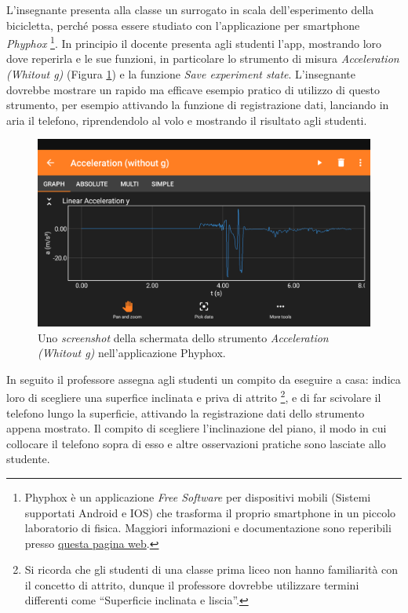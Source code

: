 \documentclass{report} \usepackage[T1]{fontenc} \usepackage[italian]{babel}
\begin{document}
L'insegnante presenta alla classe un surrogato in scala dell'esperimento della
bicicletta, perché possa essere studiato con l'applicazione per smartphone
\emph{Phyphox}
\footnote{
          Phyphox è un applicazione \emph{Free Software} per dispositivi mobili
          (Sistemi supportati Android e IOS) che trasforma il proprio
          smartphone in un piccolo laboratorio di fisica. Maggiori
          informazioni e documentazione sono reperibili presso
          \textcolor{blue}{\href{https://phyphox.org/}{questa pagina web}}.
         }.
In principio il docente presenta agli studenti l'app, mostrando loro dove
reperirla e le sue funzioni, in particolare lo strumento di misura
\emph{Acceleration (Whitout g)} (Figura \ref{fig:phyphox}) e la funzione
\emph{Save experiment state}.
L'insegnante dovrebbe mostrare un rapido ma efficave esempio pratico
di utilizzo di questo strumento, per esempio attivando la funzione
di registrazione dati, lanciando in aria il telefono, riprendendolo
al volo e mostrando il risultato agli studenti.
\begin{figure}[H]
\centering
  \includegraphics[width=\textwidth]{phyphox}
  \caption{Uno \emph{screenshot} della schermata dello strumento
           \emph{Acceleration (Whitout g)}
           nell'applicazione Phyphox.}
  \label{fig:phyphox}
\end{figure}
In seguito il professore assegna agli studenti un compito da eseguire
a casa: indica loro di scegliere una superfice inclinata
e priva di attrito
\footnote{
          Si ricorda che gli studenti di una classe prima liceo
          non hanno familiarità con il concetto di attrito,
          dunque il professore dovrebbe utilizzare termini differenti
          come ``Superficie inclinata e liscia''.
         },
e di far scivolare il telefono lungo la superficie, attivando
la registrazione dati dello strumento appena mostrato.
Il compito di scegliere l'inclinazione del piano, il modo in cui
collocare il telefono sopra di esso e altre osservazioni pratiche
sono lasciate allo studente.
\end{document}
